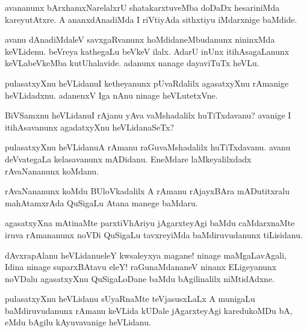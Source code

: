 \begin{mng}
avananunx bArxhamxNarelalxrU shatakarxtuveMba doDaDx hesariniMda kareyutAtxre. A ananxdAnadiMda I riVtiyAda sithxtiyu iMdarxnige baMdide.
\end{mng}

\begin{mng}
avanu dAnadiMdaleV savxgaRvanunx hoMdidaneMbudanunx nininxMda keVLidenu. beVreya kathegaLu beVkeV ilalx. AdarU inUnx itihAsagaLanunx keVLabeVkeMba kutUhalavide. adanunx nanage dayaviTuTx heVLu.
\end{mng}

\begin{mng}
pulasatxyXnu heVLidanu\mdash I ketheyanunx pUvaRdalilx agasatxyXnu rAmanige heVLidadxnu. adanenxV Iga nAnu ninage heVLutetxVne.
\end{mng}

\begin{mng}
BiVSamxnu heVLidanu\mdash I rAjanu yAva vaMshadalilx huTiTxdavanu? avanige I itihAsavanunx agadatxyXnu heVLidanaSeTx?
\end{mng}

\begin{mng}
pulasatxyXnu heVLidanu\mdash A rAmanu raGuvaMshadalilx huTiTxdavanu. avanu deVvategaLa kelasavanunx mADidanu. EneMdare laMkeyalilxdadx rAvaNananunx koMdanu.
\end{mng}

\begin{mng}
rAvaNananunx koMdu BUloVkadalilx A rAmanu rAjayxBAra mADutitxralu mahAtamxrAda QuSigaLu Atana manege baMdaru.
\end{mng}

\begin{mng}
agasatxyXna mAtinaMte parxtiVhAriyu jAgarxteyAgi baMdu caMdarxnaMte iruva rAmananunx noVDi QuSigaLu tavxreyiMda baMdiruvudanunx tiLisidanu.
\end{mng}

\begin{mng}
dAvxrapAlanu heVLidanu\mdash eleY kwsaleyxya magane! ninage maMgaLavAgali, Idina ninage suparxBAtavu eleY! raGunaMdananeV ninanx ELigeyanunx noVDalu agasatxyXnu QuSigaLoDane baMdu bAgilinalilx niMtidAdxne.
\end{mng}

\begin{mng}
pulasatxyXnu heVLidanu sUyaRnaMte teVjasusxLaLx A munigaLu baMdiruvudanunx rAmanu keVLida kUDale jAgarxteyAgi karedukoMDu bA, eMdu bAgilu kAyuvavanige heVLidanu.
\end{mng}

